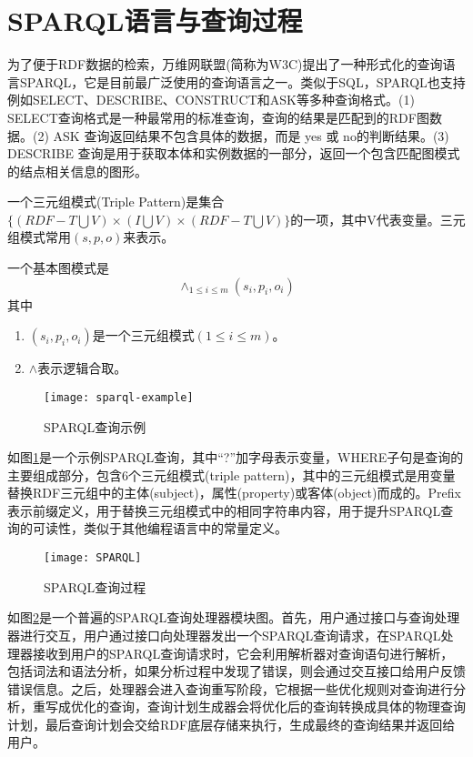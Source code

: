 \section{SPARQL语言与查询过程}
为了便于RDF数据的检索，万维网联盟(简称为W3C)提出了一种形式化的查询语言SPARQL，它是目前最广泛使用的查询语言之一。类似于SQL，SPARQL也支持例如SELECT、DESCRIBE、CONSTRUCT和ASK等多种查询格式。(1) SELECT查询格式是一种最常用的标准查询，查询的结果是匹配到的RDF图数据。(2) ASK 查询返回结果不包含具体的数据，而是 yes 或 no的判断结果。(3) DESCRIBE 查询是用于获取本体和实例数据的一部分，返回一个包含匹配图模式的结点相关信息的图形。
\begin{definition}[（三元组模式）] 
    \label{Triple}   
    一个三元组模式(Triple Pattern)是集合$\lbrace (RDF-T \bigcup V)\times(I \bigcup V)\times(RDF-T \bigcup V)\rbrace$的一项，其中V代表变量。三元组模式常用$(s,p,o)$来表示。
\end{definition}
\begin{definition}    
    \label{BGP}
    一个基本图模式是$$\wedge_{1\leqslant i\leqslant m}(s_i,p_i,o_i)$$
    其中
    \begin{enumerate}
        \item $(s_i,p_i,o_i)$是一个三元组模式$(1 \leqslant  i \leqslant m)$。
        \item $\wedge$表示逻辑合取。
    \end{enumerate}
    
\end{definition}

\begin{figure}[h]
    \centering
    \texttt{[image: sparql-example]}
    \caption{SPARQL查询示例}
    \label{sparql-example}
\end{figure}

如图\ref{sparql-example}是一个示例SPARQL查询，其中“?”加字母表示变量，WHERE子句是查询的主要组成部分，包含6个三元组模式(triple pattern)，其中的三元组模式是用变量替换RDF三元组中的主体(subject)，属性(property)或客体(object)而成的。Prefix表示前缀定义，用于替换三元组模式中的相同字符串内容，用于提升SPARQL查询的可读性，类似于其他编程语言中的常量定义。

\begin{figure}[h]
    \centering
    \texttt{[image: SPARQL]}
    \caption{SPARQL查询过程}
    \label{SPARQL查询过程}
\end{figure}

如图\ref{SPARQL查询过程}是一个普遍的SPARQL查询处理器模块图。首先，用户通过接口与查询处理器进行交互，用户通过接口向处理器发出一个SPARQL查询请求，在SPARQL处理器接收到用户的SPARQL查询请求时，它会利用解析器对查询语句进行解析，包括词法和语法分析，如果分析过程中发现了错误，则会通过交互接口给用户反馈错误信息。之后，处理器会进入查询重写阶段，它根据一些优化规则对查询进行分析，重写成优化的查询，查询计划生成器会将优化后的查询转换成具体的物理查询计划，最后查询计划会交给RDF底层存储来执行，生成最终的查询结果并返回给用户。

